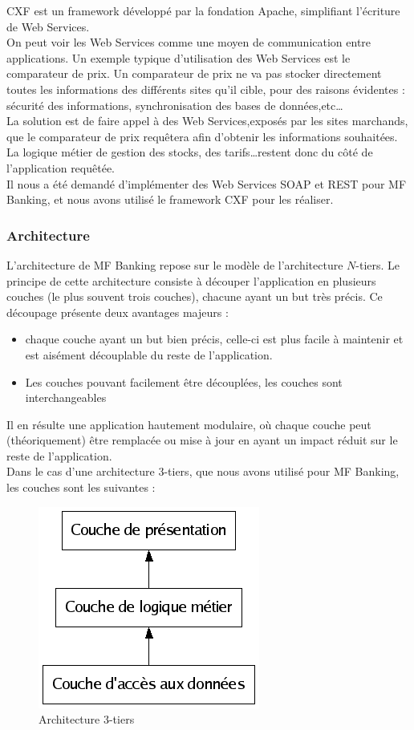CXF est un framework développé par la fondation Apache, simplifiant l'écriture de Web Services.\\

On peut voir les Web Services comme une moyen de communication entre applications.
Un exemple typique d'utilisation des Web Services est le comparateur de prix. Un comparateur de prix ne va pas stocker directement toutes les informations des différents sites qu'il cible, pour des raisons évidentes : sécurité des informations, synchronisation des bases de données,etc\ldots\\La solution est de faire appel à des Web Services,exposés par les sites marchands, que le comparateur de prix requêtera afin d'obtenir les informations souhaitées. La logique métier de gestion des stocks, des tarifs\ldots restent donc du côté de l'application requêtée.\\

Il nous a été demandé d'implémenter des Web Services SOAP et REST pour MF Banking, et nous avons  utilisé le framework CXF pour les réaliser.

\subsubsection{Architecture}

L'architecture de MF Banking repose sur le modèle de l'architecture $N$-tiers.
Le principe de cette architecture consiste à découper l'application en plusieurs couches (le plus souvent trois couches), chacune ayant un but très précis. Ce découpage présente deux avantages majeurs :
\begin{itemize}
	\item chaque couche ayant un but bien précis, celle-ci est plus facile à maintenir et est aisément découplable du reste de l'application. 
	\item Les couches pouvant facilement être découplées, les couches sont interchangeables
\end{itemize}
Il en résulte une application hautement modulaire, où chaque couche peut (théoriquement) être remplacée ou mise à jour en ayant un impact réduit sur le reste de l'application.\\

Dans le cas d'une architecture 3-tiers, que nous avons utilisé pour MF Banking, les  couches sont les suivantes :

\begin{figure} [h!]
	\centering
		\includegraphics[scale=0.5]{ntiers.png}
	\caption{Architecture 3-tiers}
\end{figure}

